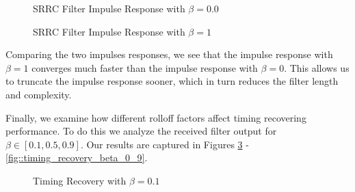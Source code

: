 \documentclass{article}
\begin{document}
\begin{figure}[H]
	\centerline{}
	\caption{SRRC Filter Impulse Response with $\beta=0.0$}
	\label{fig::srrc_impulse_response_beta_0}
\end{figure}

\begin{figure}[H]
	\centerline{}
	\caption{SRRC Filter Impulse Response with $\beta=1$}
	\label{fig::srrc_impulse_response_beta_1}
\end{figure}

\noindent Comparing the two impulses responses, we see that the impulse response with $\beta=1$ converges much faster than the impulse response with $\beta=0$. This allows us to truncate the impulse response sooner, which in turn reduces the filter length and complexity.

Finally, we examine how different rolloff factors affect timing recovering performance. To do this we analyze the received filter output for $\beta \in [0.1, 0.5, 0.9]$. Our results are captured in Figures \ref{fig::timing_recovery_beta_0_1} - \ref{fig::timing_recovery_beta_0_9}.

\begin{figure}[H]
	\centerline{}
	\caption{Timing Recovery with $\beta=0.1$}
	\label{fig::timing_recovery_beta_0_1}
\end{figure}
\end{document}
